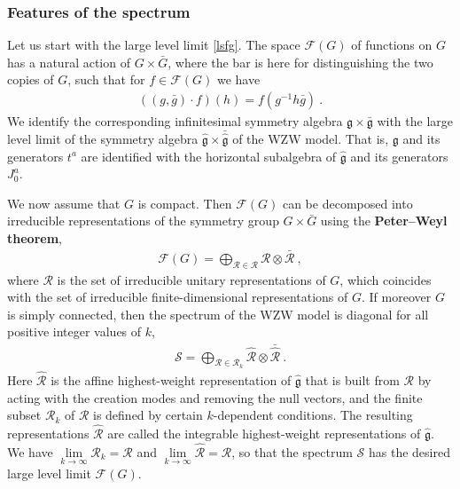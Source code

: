 \documentclass[12pt, a4paper, notitlepage, twoside]{report}
\numberwithin{equation}{section}
\theoremstyle{break}
\begin{document}
\subsubsection{Features of the spectrum}

Let us start with the large level limit \eqref{lsfg}.
The space $\mathcal{F}(G)$ of functions on $G$ has a natural action of 
$G\times \bar{G}$, where the bar is here for distinguishing the two copies of $G$, such that for $f\in \mathcal{F}(G)$ we have 
\begin{align}
\left( (g,\bar{g})\cdot f\right)(h) = f(g^{-1}h\bar{g})\ .
\end{align}
We identify the corresponding infinitesimal symmetry algebra $\mathfrak{g}\times \bar{\mathfrak{g}}$ with the large level limit of the symmetry algebra $\hat{\mathfrak{g}}\times \bar{\hat{\mathfrak{g}}}$ of the WZW model.
That is, $\mathfrak{g}$ and its generators $t^a$ are identified with the horizontal subalgebra of $\hat{\mathfrak{g}}$ and its generators $J^a_0$.

We now assume that $G$ is compact.
Then $\mathcal{F}(G)$ can be decomposed into irreducible representations of the symmetry group $G\times \bar{G}$ using the \textbf{\boldmath Peter--Weyl theorem}, 
\begin{align}
 \mathcal{F}(G) = \bigoplus_{\mathcal{R}\in \mathcal{R}} \mathcal{R}\otimes \bar{\mathcal{R}}\ ,
\end{align}
where $\mathcal{R}$ is the set of irreducible unitary representations of $G$, which coincides with the set of irreducible finite-dimensional representations of $G$.
If moreover $G$ is simply connected, then the spectrum of the WZW model is diagonal for all positive integer values of $k$, \cite{fms97}
\begin{align}
 \mathcal{S} = \bigoplus_{\mathcal{R}\in \mathcal{R}_k} \hat{\mathcal{R}}\otimes \bar{\hat{\mathcal{R}}}\ .
\end{align}
Here $\hat{\mathcal{R}}$ is the affine highest-weight representation of $\hat{\mathfrak{g}}$ that is built from $\mathcal{R}$ by acting with the creation modes and removing the null vectors, and the finite subset $\mathcal{R}_k$ of $\mathcal{R}$ is defined by certain $k$-dependent conditions.
The resulting representations $\hat{\mathcal{R}}$ are called the integrable highest-weight representations of $\hat{\mathfrak{g}}$. 
We have $\underset{k\to\infty}{\lim} \mathcal{R}_k =\mathcal{R}$ and $\underset{k\to \infty}{\lim} \hat{\mathcal{R}} = \mathcal{R}$, so that the spectrum $\mathcal{S}$ has the desired large level limit $\mathcal{F}(G)$.
\end{document}
